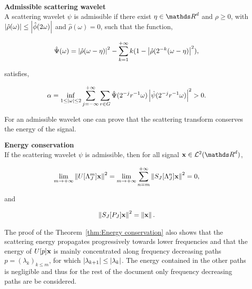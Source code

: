\documentclass[a4paper,11pt]{report}
\begin{document}
			\begin{defn} \textbf{Admissible scattering wavelet}\\ 
				A scattering wavelet $\psi$ is admissible if there exist $\eta \in \dsR^{d}$ and $\rho \geq 0$, with $\left| \hat{\rho}(\omega) \right| \leq \left| \hat{\phi}(2\omega) \right|$ and $\hat{\rho}(\omega)=0$, such that the function,
				
				\begin{equation}
					\hat{\Psi}(\omega) = \left| \hat{\rho}(\omega - \eta) \right|^{2} - \sum_{k=1}^{+\infty}k(1-\left| \hat{\rho}(2^{-k}(\omega - \eta) \right|^{2}),
				\end{equation}
				
				satisfies,
				
				\begin{equation}
				  \alpha = \inf_{1 \leq \left| \omega \right|\leq 2} \sum_{j=-\infty}^{+\infty}\sum_{r \in G} \hat{\Psi}(2^{-j}r^{-1}\omega) \left| \hat{\psi}(2^{-j}r^{-1}\omega) \right|^{2} > 0.\\
				\end{equation}
				
				\label{def:Admissible wavelet}
			\end{defn}

			For an admissible wavelet one can prove that the scattering transform conserves the energy of the signal.
			
			\begin{thm} \textbf{Energy conservation}\\ 
				If the scattering wavelet $\psi$ is admissible, then for all signal $\bfx \in \mcalL^{2}(\dsR^{d})$, %
				
				\begin{equation}
				  \lim_{m \rightarrow +\infty} \left\lVert U[\Lambda_{J}^{m}]{\bf x} \right\rVert^{2} = \lim_{m \rightarrow +\infty} \sum_{n=m}^{+\infty} \left\lVert S_{J}[\Lambda_{J}^{n}]{\bf x} \right\rVert^{2} = 0,
					\label{eq:energy conservation 1}
				\end{equation}
				
				and
				
				\begin{equation}
				  \left\lVert S_{J}[P_{J}]{\bf x} \right\rVert^{2} = \left\lVert {\bf x} \right\rVert.
				  \label{eq:energy conservation 2}
				\end{equation}
				\label{thm:Energy conservation}
			\end{thm}

			The proof of the Theorem~\ref{thm:Energy conservation} also shows that the scattering energy propagates progressively towards lower frequencies and that the energy of $U[p]{\bf x}$ is mainly concentrated along frequency decreasing paths $p=(\lambda_{k})_{k\leq m}$, \ie for which $\left| \lambda_{k+1} \right| \leq \left| \lambda_{k} \right|$. The energy contained in the other paths is negligible and thus for the rest of the document only frequency decreasing paths are be considered.\\
			
\end{document}
